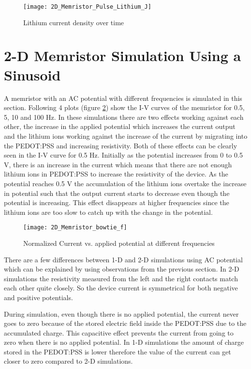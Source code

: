 \begin{doublespace}
\begin{figure}[!htp]
\centering
\texttt{[image: 2D\_Memristor\_Pulse\_Lithium\_J]}
\caption{Lithium current density over time} 
\label{mag_lit_curr}
\end{figure}


\clearpage
\section{2-D Memristor Simulation Using a Sinusoid}

A memristor with an AC potential with different frequencies is simulated in this section. Following 4 plots (figure \ref{1dIV}) show the I-V curves of the memristor for 0.5, 5, 10 and 100 Hz. In these simulations there are two effects working against each other, the increase in the applied potential which increases the current output and the lithium ions working against the increase of the current by migrating into the PEDOT:PSS and increasing resistivity. Both of these effects can be clearly seen in the I-V curve for 0.5 Hz. Initially as the potential increases from 0 to 0.5 V, there is an increase in the current which means that there are not enough lithium ions in PEDOT:PSS to increase the resistivity of the device. As the potential reaches 0.5 V the accumulation of the lithium ions overtake the increase in potential such that the output current starts to decrease even though the potential is increasing. This effect disappears at higher frequencies since the lithium ions are too slow to catch up with the change in the potential. 
   
\begin{figure}[!htp]
\centering
\texttt{[image: 2D\_Memristor\_bowtie\_f]}
\caption{Normalized Current vs. applied potential at different frequencies} 
\label{1dIV}
\end{figure}

There are a few differences between 1-D and 2-D simulations using AC potential which can be explained by using observations from the previous section. In 2-D simulations the resistivity measured from the left and the right contacts match each other quite closely. So the device current is symmetrical for both negative and positive potentials. 

During simulation, even though there is no applied potential, the current never goes to zero because of the stored electric field inside the PEDOT:PSS due to the accumulated charge. This capacitive effect prevents the current from going to zero when there is no applied potential. In 1-D simulations the amount of charge stored in the PEDOT:PSS is lower therefore the value of the current can get closer to zero compared to 2-D simulations.  


\end{doublespace}
